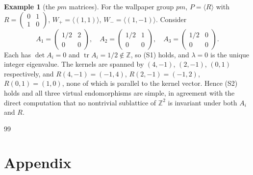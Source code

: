 \documentclass[12pt]{article}
\theoremstyle{definition}
\newtheorem{example}{Example}
\begin{document}
\begin{example}[the $pm$ matrices]
For the wallpaper group $pm$, $P=\langle R\rangle$ with
$R=\begin{pmatrix}0&1\\1&0\end{pmatrix}$, $W_+=\langle(1,1)\rangle$,
$W_-=\langle(1,-1)\rangle$. Consider
\[
A_1=\begin{pmatrix}1/2&2\\0&0\end{pmatrix},\quad
A_2=\begin{pmatrix}1/2&1\\0&0\end{pmatrix},\quad
A_3=\begin{pmatrix}1/2&0\\0&0\end{pmatrix}.
\]
Each has $\det A_i=0$ and $\operatorname{tr}A_i=1/2\notin\mathbb{Z}$, so
(S1) holds, and $\lambda=0$ is the unique integer eigenvalue. The
kernels are spanned by $(4,-1)$, $(2,-1)$, $(0,1)$ respectively, and
$R(4,-1)=(-1,4)$, $R(2,-1)=(-1,2)$, $R(0,1)=(1,0)$, none of which is
parallel to the kernel vector. Hence (S2) holds and all three virtual
endomorphisms are simple, in agreement with the direct computation that
no nontrivial sublattice of $\mathbb{Z}^2$ is invariant under both $A_i$
and $R$.
\end{example}


\begin{thebibliography}{99}



\end{thebibliography}


\appendix
\section*{Appendix}
\end{document}
